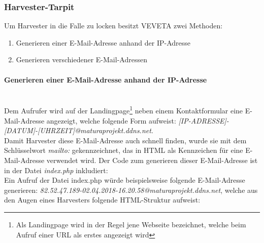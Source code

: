\subsubsection{Harvester-Tarpit}
Um Harvester in die Falle zu locken besitzt VEVETA zwei Methoden:
\begin{enumerate}
	\item Generieren einer E-Mail-Adresse anhand der IP-Adresse
	\item Generieren verschiedener E-Mail-Adressen
\end{enumerate}
\paragraph{Generieren einer E-Mail-Adresse anhand der IP-Adresse}\mbox{}\\
Dem Aufrufer wird auf der Landingpage\footnote{Als Landingpage wird in der Regel jene Webseite bezeichnet, welche beim Aufruf einer URL als erstes angezeigt wird} neben einem Kontaktformular eine E-Mail-Adresse angezeigt, welche folgende Form aufweist: \emph{[IP-ADRESSE]-[DATUM]-[UHRZEIT]@maturaprojekt.ddns.net}.\\
Damit Harvester diese E-Mail-Adresse auch schnell finden, wurde sie mit dem Schlüsselwort \emph{mailto:} gekennzeichnet, das in HTML als Kennzeichen für eine E-Mail-Adresse verwendet wird. Der Code zum generieren dieser E-Mail-Adresse ist in der Datei \emph{index.php} inkludiert:\\

Ein Aufruf der Datei index.php würde beispielsweise folgende E-Mail-Adresse generieren:
\emph{82.52.47.189-02.04.2018-16.20.58@maturaprojekt.ddns.net}, welche aus den Augen eines Harvesters folgende HTML-Struktur aufweist:\\

